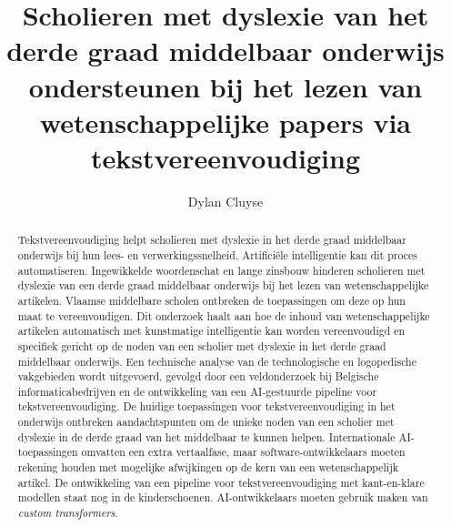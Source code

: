 \documentclass{hogent-article}
\title{Scholieren met dyslexie van het derde graad middelbaar onderwijs ondersteunen bij het lezen van wetenschappelijke papers via tekstvereenvoudiging}
\author{Dylan Cluyse}
\begin{document}
\begin{abstract}
Tekstvereenvoudiging helpt scholieren met dyslexie in het derde graad middelbaar onderwijs bij hun lees- en verwerkingssnelheid. Artificiële intelligentie kan dit proces automatiseren. Ingewikkelde woordenschat en lange zinsbouw hinderen scholieren met dyslexie van een derde graad middelbaar onderwijs bij het lezen van wetenschappelijke artikelen. Vlaamse middelbare scholen ontbreken de toepassingen om deze op hun maat te vereenvoudigen. Dit onderzoek haalt aan hoe de inhoud van wetenschappelijke artikelen automatisch  met kunstmatige intelligentie kan worden vereenvoudigd en specifiek gericht op de noden van een scholier met dyslexie in het derde graad middelbaar onderwijs. Een technische analyse van de technologische en logopedische vakgebieden wordt uitgevoerd, gevolgd door een veldonderzoek bij Belgische informaticabedrijven en de ontwikkeling van een AI-gestuurde pipeline voor tekstvereenvoudiging. De huidige toepassingen voor tekstvereenvoudiging in het onderwijs ontbreken aandachtspunten om de unieke noden van een scholier met dyslexie in de derde graad van het middelbaar te kunnen helpen. Internationale AI-toepassingen omvatten een extra vertaalfase, maar software-ontwikkelaars moeten rekening houden met mogelijke afwijkingen op de kern van een wetenschappelijk artikel. De ontwikkeling van een pipeline voor tekstvereenvoudiging met kant-en-klare modellen staat nog in de kinderschoenen. AI-ontwikkelaars moeten gebruik maken van \textit{custom transformers}.
\end{abstract}

\tableofcontents



\printbibliography[heading=bibintoc]
\end{document}
